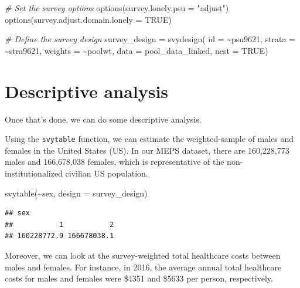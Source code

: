\documentclass[
]{book}
\newenvironment{Shaded}{\begin{snugshade}}{\end{snugshade}}
\newcommand{\AttributeTok}[1]{\textcolor[rgb]{0.77,0.63,0.00}{#1}}
\newcommand{\CommentTok}[1]{\textcolor[rgb]{0.56,0.35,0.01}{\textit{#1}}}
\newcommand{\ConstantTok}[1]{\textcolor[rgb]{0.00,0.00,0.00}{#1}}
\newcommand{\FunctionTok}[1]{\textcolor[rgb]{0.00,0.00,0.00}{#1}}
\newcommand{\NormalTok}[1]{#1}
\newcommand{\OtherTok}[1]{\textcolor[rgb]{0.56,0.35,0.01}{#1}}
\newcommand{\SpecialCharTok}[1]{\textcolor[rgb]{0.00,0.00,0.00}{#1}}
\newcommand{\StringTok}[1]{\textcolor[rgb]{0.31,0.60,0.02}{#1}}
\begin{document}
\begin{Shaded}
\begin{Highlighting}[]
\CommentTok{\# Set the survey options}
\FunctionTok{options}\NormalTok{(}\AttributeTok{survey.lonely.psu =} \StringTok{"adjust"}\NormalTok{)}
\FunctionTok{options}\NormalTok{(}\AttributeTok{survey.adjust.domain.lonely =} \ConstantTok{TRUE}\NormalTok{)}


\CommentTok{\# Define the survey design}
\NormalTok{survey\_design }\OtherTok{=} \FunctionTok{svydesign}\NormalTok{(}
                          \AttributeTok{id =} \SpecialCharTok{\textasciitilde{}}\NormalTok{psu9621,}
                          \AttributeTok{strata =} \SpecialCharTok{\textasciitilde{}}\NormalTok{stra9621,}
                          \AttributeTok{weights =} \SpecialCharTok{\textasciitilde{}}\NormalTok{poolwt,}
                          \AttributeTok{data =}\NormalTok{ pool\_data\_linked,}
                          \AttributeTok{nest =} \ConstantTok{TRUE}\NormalTok{)}
\end{Highlighting}
\end{Shaded}

\hypertarget{descriptive-analysis}{%
\section{Descriptive analysis}\label{descriptive-analysis}}

Once that's done, we can do some descriptive analysis.

Using the \texttt{svytable} function, we can estimate the weighted-sample of males and females in the United States (US). In our MEPS dataset, there are 160,228,773 males and 166,678,038 females, which is representative of the non-institutionalized civilian US population.

\begin{Shaded}
\begin{Highlighting}[]
\FunctionTok{svytable}\NormalTok{(}\SpecialCharTok{\textasciitilde{}}\NormalTok{sex, }\AttributeTok{design =}\NormalTok{ survey\_design)}
\end{Highlighting}
\end{Shaded}

\begin{verbatim}
## sex
##           1           2 
## 160228772.9 166678038.1
\end{verbatim}

Moreover, we can look at the survey-weighted total healthcare costs between males and females. For instance, in 2016, the average annual total healthcare costs for males and females were \$4351 and \$5633 per person, respectively.
\end{document}
